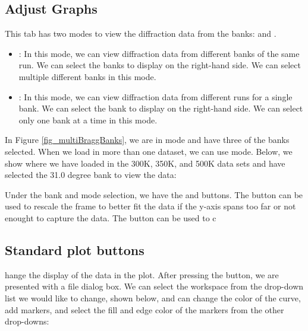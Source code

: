 \subsection{Adjust Graphs}

This tab has two modes to view the diffraction data from the banks:  and . 

\begin{itemize}

\item {}: In this mode, we can view diffraction data from different banks of the same run. We can select the banks to display on the right-hand side. We can select multiple different banks in this mode.

\item {}: In this mode, we can view diffraction data from different runs for a single bank. We can select the bank to display on the right-hand side. We can select only one bank at a time in this mode.

\end{itemize}

In Figure \ref{fig_multiBraggBanks}, we are in  mode and have three of the banks selected. When we load in more than one dataset, we can use  mode. Below, we show where we have loaded in the 300K, 350K, and 500K data sets and have selected the 31.0 degree bank to view the data:

\noindent{} \label{fig_multiBraggBanks}

Under the bank and mode selection, we have the  and  buttons. The  button can be used to rescale the frame to better fit the data if the y-axis spans too far or not enought to capture the data. The  button can be used to c\subsection{Standard plot buttons}hange the display of the data in the plot. After pressing the  button, we are presented with a file dialog box. We can select the workspace from the drop-down list we would like to change, shown below, and can change the color of the curve, add markers, and select the fill and edge color of the markers from the other drop-downs: 

